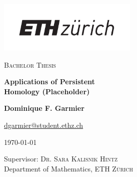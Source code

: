 \begin{titlepage}
\begin{center}
\vspace{1cm}
\includegraphics[width=0.5\textwidth]{assets/logo.pdf}\\
\vspace{1cm}


\textsc{Bachelor Thesis}

\vspace{1cm}

{\huge \textbf{Applications of Persistent \\[0.5em] Homology (Placeholder)}}

\vspace{1cm}
\textbf{Dominique F. Garmier}
       
\vspace{0.15cm}
       
\href{mailto:dgarmier@student.ethz.ch}{dgarmier@student.ethz.ch}

\vspace{0.25cm}

\today

\vfill
            
\vspace{0.8cm}
     
Supervisor: \textsc{Dr. Sara Kalisnik Hintz}\\
Department of Mathematics, \textsc{ETH Zürich}\\
       
\end{center}
\end{titlepage}
